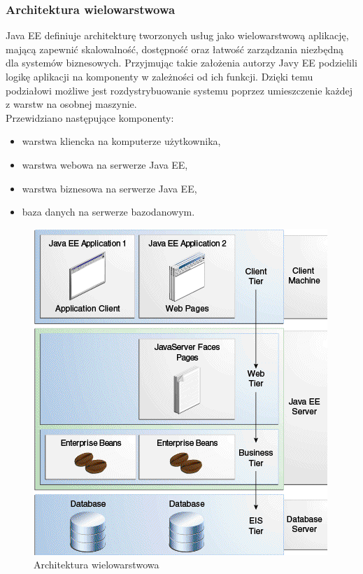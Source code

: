 \documentclass[12pt,twoside]{article}
\providecommand{\tightlist}{  \setlength{\itemsep}{0pt}\setlength{\parskip}{0pt}}
\begin{document}
\subsubsection{Architektura
wielowarstwowa}\label{architektura-wielowarstwowa}

Java EE definiuje architekturę tworzonych usług jako wielowarstwową
aplikację, mającą zapewnić skalowalność, dostępność oraz łatwość
zarządzania niezbędną dla systemów biznesowych. Przyjmując takie
założenia autorzy Javy EE podzielili logikę aplikacji na komponenty w
zależności od ich funkcji. Dzięki temu podziałowi możliwe jest
rozdystrybuowanie systemu poprzez umieszczenie każdej z warstw na
osobnej maszynie.\\
Przewidziano następujące komponenty:

\begin{itemize}
\tightlist
\item
  warstwa kliencka na komputerze użytkownika,
\item
  warstwa webowa na serwerze Java EE,
\item
  warstwa biznesowa na serwerze Java EE,
\item
  baza danych na serwerze bazodanowym.
\end{itemize}

\begin{figure}[htbp]
\centering
\includegraphics[resolution=150]{graphics/multitiered-application.png}
\caption{Architektura wielowarstwowa \autocite{jendrock2014jee}}
\end{figure}
\end{document}
